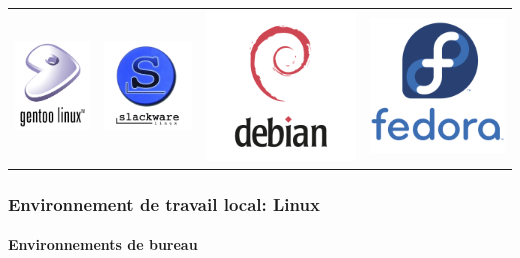 \documentclass{beamer}
\begin{document}
\begin{frame}
\begin{tabular}{llll}
	\includegraphics[width=.2\textwidth]{..//img/Bweb01-environnement/gentoo-logo.png} & 
	\includegraphics[width=.2\textwidth]{..//img/Bweb01-environnement/slackware-logo.png} &
	\includegraphics[width=.2\textwidth]{..//img/Bweb01-environnement/debian-logo.png} & 
	\includegraphics[width=.2\textwidth]{..//img/Bweb01-environnement/fedora-logo.png} \\
	
\end{tabular}

\end{frame}

\begin{frame}
\frametitle{Environnement de travail local: Linux}
\framesubtitle{Environnements de bureau}

\end{frame}
\end{document}
